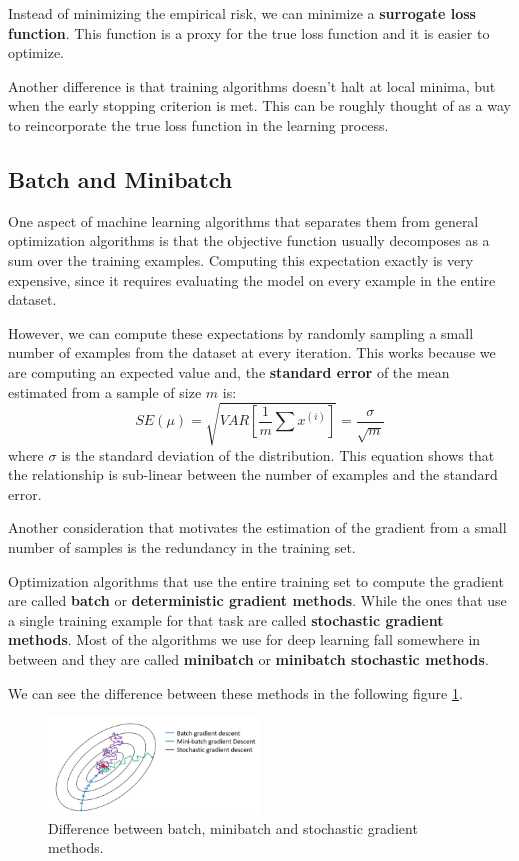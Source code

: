 Instead of minimizing the empirical risk, we can minimize a \textbf{surrogate
    loss function}. This function is a proxy for the true loss function and it
is easier to optimize.

Another difference is that training algorithms doesn't halt at local minima, but
when the early stopping criterion is met. This can be roughly thought of as a
way to reincorporate the true loss function in the learning process.
\subsection{Batch and Minibatch}
One aspect of machine learning algorithms that separates them from general
optimization algorithms is that the objective function usually decomposes as a
sum over the training examples. Computing this expectation exactly is very
expensive, since it requires evaluating the model on every example in the entire
dataset.

However, we can compute these expectations by randomly sampling a small number
of examples from the dataset at every iteration. This works because we are
computing an expected value and, the \textbf{standard error} of the mean estimated
from a sample of size $m$ is:
\begin{equation}
    SE(\mu) = \sqrt{VAR\left[\frac{1}{m}\sum x^{(i)}\right]} = \frac{\sigma}{\sqrt{m}}
\end{equation}
where $\sigma$ is the standard deviation of the distribution. This equation shows
that the relationship is sub-linear between the number of examples and the standard error.

Another consideration that motivates the estimation of the gradient from a
small number of samples is the redundancy in the training set.

Optimization algorithms that use the entire training set to compute the gradient
are called \textbf{batch} or \textbf{deterministic gradient methods}. While the
ones that use a single training example for that task are called \textbf{stochastic
    gradient methods}. Most of the algorithms we use for deep learning fall
somewhere in between and they are called \textbf{minibatch} or \textbf{minibatch
    stochastic methods}.

We can see the difference between these methods in the following figure \ref{fig:batchminibatch}.
\begin{figure}[!ht]
    \centering
    \includegraphics[width=0.5\textwidth]{img/minibatchvsbatch.png}
    \caption{Difference between batch, minibatch and stochastic gradient methods.}
    \label{fig:batchminibatch}
\end{figure}

